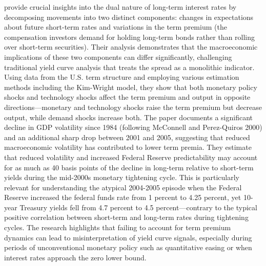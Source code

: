 \citet{rudebusch2006macroeconomic} provide crucial insights into the dual nature of long-term interest rates by decomposing movements into two distinct components: changes in expectations about future short-term rates and variations in the term premium (the compensation investors demand for holding long-term bonds rather than rolling over short-term securities). Their analysis demonstrates that the macroeconomic implications of these two components can differ significantly, challenging traditional yield curve analysis that treats the spread as a monolithic indicator. Using data from the U.S. term structure and employing various estimation methods including the Kim-Wright model, they show that both monetary policy shocks and technology shocks affect the term premium and output in opposite directions—monetary and technology shocks raise the term premium but decrease output, while demand shocks increase both. The paper documents a significant decline in GDP volatility since 1984 (following McConnell and Perez-Quiros 2000) and an additional sharp drop between 2001 and 2005, suggesting that reduced macroeconomic volatility has contributed to lower term premia. They estimate that reduced volatility and increased Federal Reserve predictability may account for as much as 40 basis points of the decline in long-term relative to short-term yields during the mid-2000s monetary tightening cycle. This is particularly relevant for understanding the atypical 2004-2005 episode when the Federal Reserve increased the federal funds rate from 1 percent to 4.25 percent, yet 10-year Treasury yields fell from 4.7 percent to 4.5 percent—contrary to the typical positive correlation between short-term and long-term rates during tightening cycles. The research highlights that failing to account for term premium dynamics can lead to misinterpretation of yield curve signals, especially during periods of unconventional monetary policy such as quantitative easing or when interest rates approach the zero lower bound.

